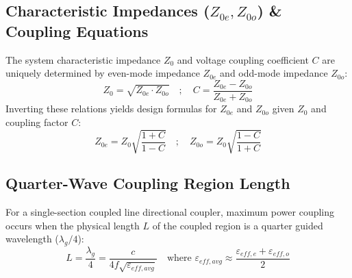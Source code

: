 \documentclass[10pt,a4paper]{article}
\begin{document}
\subsection{Characteristic Impedances (\texorpdfstring{$Z_{0e}, Z_{0o}$}{Z0e, Z0o}) \& Coupling Equations}

\begin{tcolorbox}[formulabox, title={Coupled Line Impedance \& Coupling Formulas}]
  The system characteristic impedance $Z_0$ and voltage coupling coefficient $C$ are uniquely determined by even-mode impedance $Z_{0e}$ and odd-mode impedance $Z_{0o}$:
  \begin{equation}
    Z_0 = \sqrt{Z_{0e} \cdot Z_{0o}} \quad ; \quad C = \frac{Z_{0e} - Z_{0o}}{Z_{0e} + Z_{0o}}
  \end{equation}
  Inverting these relations yields design formulas for $Z_{0e}$ and $Z_{0o}$ given $Z_0$ and coupling factor $C$:
  \begin{equation}
    Z_{0e} = Z_0 \sqrt{\frac{1+C}{1-C}} \quad ; \quad Z_{0o} = Z_0 \sqrt{\frac{1-C}{1+C}}
  \end{equation}
\end{tcolorbox}

\subsection{Quarter-Wave Coupling Region Length}
For a single-section coupled line directional coupler, maximum power coupling occurs when the physical length $L$ of the coupled region is a quarter guided wavelength ($\lambda_g/4$):
\begin{equation}
  L = \frac{\lambda_g}{4} = \frac{c}{4 f \sqrt{\varepsilon_{eff,avg}}} \quad \text{where } \varepsilon_{eff,avg} \approx \frac{\varepsilon_{eff,e} + \varepsilon_{eff,o}}{2}
\end{equation}
\end{document}
